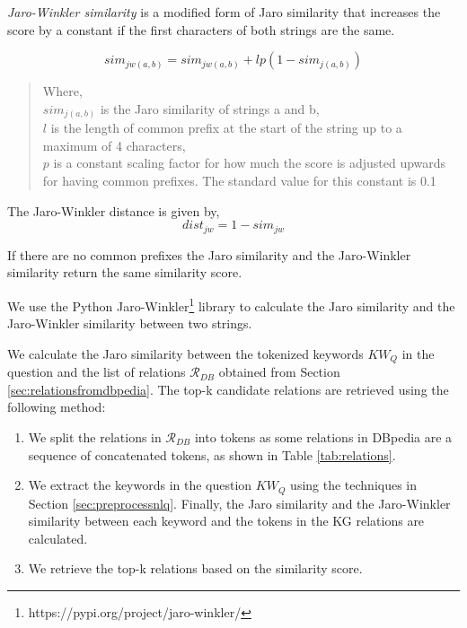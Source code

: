 \textit{Jaro-Winkler similarity} is a modified form of Jaro similarity that increases the score by a constant if the first characters of both strings are the same. 

\begin{singlespace}
\begin{equation}
   sim_{jw(a,b)} = sim_{jw(a,b)} + lp(1-sim_{j(a,b)})
\end{equation}
\end{singlespace}

\begin{quote}
Where, \\
$sim_{j(a,b)}$ is the Jaro similarity of strings a and b, \\
$l$  is the length of common prefix at the start of the string up to a maximum of 4 characters, \\
$p$ is a constant scaling factor for how much the score is adjusted upwards for having common prefixes. The standard value for this constant is 0.1
\end{quote}

The Jaro-Winkler distance is given by,
\begin{equation}
    dist_{jw}=1-sim_{jw}
\end{equation}

If there are no common prefixes the Jaro similarity and the Jaro-Winkler similarity return the same similarity score.

We use the Python Jaro-Winkler\footnote{https://pypi.org/project/jaro-winkler/} library to calculate the Jaro similarity and the Jaro-Winkler similarity  between two strings. 

We calculate the Jaro similarity between the tokenized keywords $KW_{Q}$ in the question and the list of relations $\mathcal{R}_{DB}$ obtained from Section \ref{sec:relationsfromdbpedia}. 
The top-k candidate relations are retrieved using the following method: 
\begin{enumerate}
    \item We split the relations in $\mathcal{R}_{DB}$ into tokens as some relations in DBpedia are a sequence of concatenated tokens, as shown in Table \ref{tab:relations}.
    \item We extract the keywords in the question $KW_{Q}$ using the techniques in Section \ref{sec:preprocessnlq}. Finally, the Jaro similarity and the Jaro-Winkler similarity between each keyword and the tokens in the KG relations are calculated.
    \item We retrieve the top-k relations based on the similarity score.
\end{enumerate}

